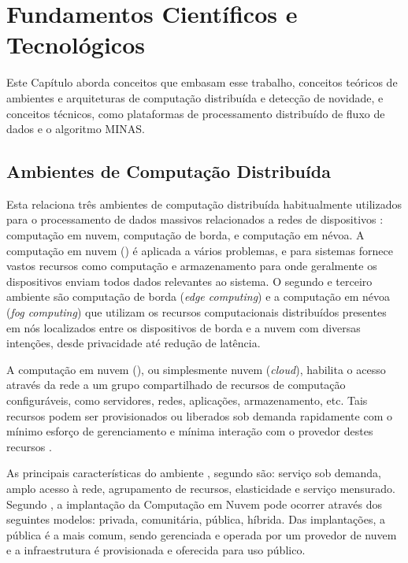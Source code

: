 
\chapter{Fundamentos Científicos e Tecnológicos}\label{cha:fundamentos}

Este Capítulo aborda conceitos que embasam esse trabalho,
conceitos teóricos de
ambientes e arquiteturas de computação distribuída e detecção de novidade,
e conceitos técnicos, como plataformas de processamento distribuído de fluxo
de dados e o algoritmo MINAS.

\section{Ambientes de Computação Distribuída}

Esta \Section relaciona três ambientes de computação distribuída habitualmente
utilizados para o processamento de dados massivos relacionados a redes de
dispositivos \iot: computação em nuvem, computação de borda, e computação em névoa.
A computação em nuvem (\cloud) é
aplicada a vários problemas, e para sistemas \iot 
fornece vastos recursos como computação e armazenamento para onde geralmente os dispositivos
enviam todos dados relevantes ao sistema.
O segundo e terceiro ambiente são computação de borda (\emph{edge computing})
e a computação em névoa (\emph{fog computing}) que utilizam os recursos
computacionais distribuídos presentes em nós localizados entre os dispositivos
de borda e a nuvem com diversas 
intenções, desde privacidade até redução de latência.


A computação em nuvem (\cloud), ou simplesmente nuvem
(\emph{cloud}), habilita o acesso através da rede a um grupo compartilhado de
recursos de computação configuráveis, como servidores, redes, aplicações,
armazenamento, etc.
Tais recursos podem ser provisionados ou liberados sob
demanda rapidamente com o mínimo esforço de gerenciamento
e mínima interação com o provedor destes recursos \cite{NIST2011}.

As principais características do ambiente \cloud, segundo 
são: serviço sob demanda, amplo acesso à rede, agrupamento de recursos,
elasticidade e serviço mensurado.
Segundo , a implantação da Computação em Nuvem pode
ocorrer através dos seguintes modelos: privada, comunitária, pública, híbrida.
Das implantações, a pública é a mais comum, sendo gerenciada e operada por um
provedor de nuvem e a infraestrutura é provisionada e oferecida para uso
público.


